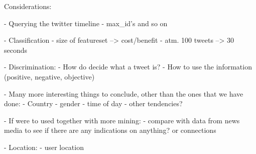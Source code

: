 \documentclass[Main]{subfiles}
\begin{document}
Considerations:



- Querying the twitter timeline
    - max_id's and so on


- Classification
    - size of featureset --> cost/benefit 
    - atm. 100 tweets --> 30 seconds


- Discrimination:
    - How do decide what a tweet is?
    - How to use the information (positive, negative, objective)





- Many more interesting things to conclude, other than the ones that we have done:
    - Country
    - gender
    - time of day
    - other tendencies?
    
- If were to used together with more mining:
    - compare with data from news media to see if there are any indications on anything? or connections


- Location:
    - user location
\end{document}
